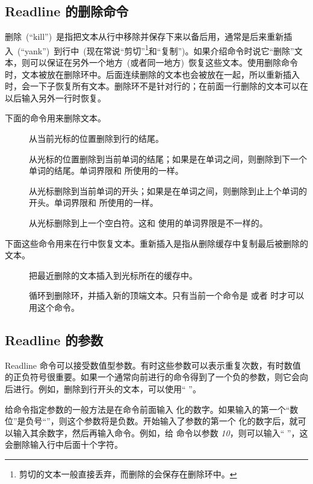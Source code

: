 \documentclass[openany,notitlepage]{book}
\newcommand{\hl}[1]{{\sl #1}}
\begin{document}
\begin{CJK}{UTF8}{song}
\subsection{Readline 的删除命令} %
删除~(``kill'')~是指把文本从行中移除并保存下来以备后用，通常是后来重新插入~(``yank'')~到行中~(现在常说``剪切''\footnote{剪切的文本一般直接丢弃，而删除的会保存在删除环中。}和``复制'')。如果介绍命令时说它``删除''文本，则可以保证在另外一个地方~(或者同一地方)~恢复这些文本。使用删除命令时，文本被放在删除环中。后面连续删除的文本也会被放在一起，所以重新插入时，会一下子恢复所有文本。删除环不是针对行的；在前面一行删除的文本可以在以后输入另外一行时恢复。

下面的命令用来删除文本。
\begin{description}
    \item[] 从当前光标的位置删除到行的结尾。
    \item[] 从光标的位置删除到当前单词的结尾；如果是在单词之间，则删除到下一个单词的结尾。单词界限和  所使用的一样。
    \item[] 从光标删除到当前单词的开头；如果是在单词之间，则删除到止上个单词的开头。单词界限和  所使用的一样。
    \item[] 从光标删除到上一个空白符。这和  使用的单词界限是不一样的。
\end{description}

下面这些命令用来在行中恢复文本。重新插入是指从删除缓存中复制最后被删除的文本。
\begin{description}
    \item[] 把最近删除的文本插入到光标所在的缓存中。
    \item[] 循环到删除环，并插入新的顶端文本。只有当前一个命令是  或者  时才可以用这个命令。
\end{description}

\subsection{Readline 的参数} %
Readline 命令可以接受数值型参数。有时这些参数可以表示重复次数，有时数值的正负符号很重要。如果一个通常向前进行的命令得到了一个负的参数，则它会向后进行。例如，删除到行开头的文本，可以使用`` ''。

给命令指定参数的一般方法是在命令前面输入  化的数字。如果输入的第一个``数位''是负号``\keystroke{-}''，则这个参数将是负数。开始输入了参数的第一个  化的数字后，就可以输入其余数字，然后再输入命令。例如，给  命令以参数 \hl{10}，则可以输入``  ''，这会删除输入行中后面十个字符。


\end{CJK}
\end{document}

